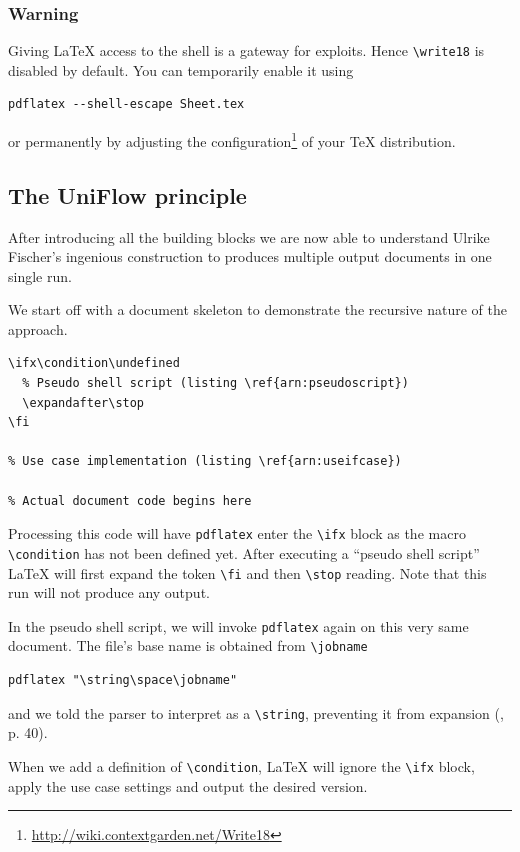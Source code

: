\documentclass{maps}
\begin{document}
\subsubsection{Warning}
Giving \LaTeX{} access to the shell is a gateway for exploits. Hence \verb+\write18+ is disabled by default. You can temporarily enable it using 
\begin{verbatim}
pdflatex --shell-escape Sheet.tex
\end{verbatim}
or permanently by adjusting the configuration\footnote{\url{http://wiki.contextgarden.net/Write18}} of your \TeX{} distribution.

\subsection{The UniFlow principle}
After introducing all the building blocks we are now able to understand Ulrike Fischer's ingenious construction \cite{arn:fischer} to produces multiple output documents in one single run.

We start off with a document skeleton to demonstrate the recursive nature of the approach.

\begin{lstlisting}[language={[LaTeX]TeX}, style=arn:lst, texcl=true, caption={General UniFlow template}, label=arn:unitemplate]
% Beginning of Sheet.tex
\ifx\condition\undefined
  % Pseudo shell script (listing \ref{arn:pseudoscript})
  \expandafter\stop
\fi

% Use case implementation (listing \ref{arn:useifcase})

% Actual document code begins here
\end{lstlisting}
Processing this code will have \texttt{pdflatex} enter the \verb+\ifx+ block as the macro \verb+\condition+ has not been defined yet. After executing a \enquote{pseudo shell script} \LaTeX{} will first expand the token \verb+\fi+ and then \verb+\stop+ reading. Note that this run will not produce any output.

In the pseudo shell script, we will invoke \texttt{pdflatex} again on this very same document. The file's base name is obtained from \verb+\jobname+ 
\begin{verbatim}
pdflatex "\string\space\jobname"
\end{verbatim}
and we told the parser to interpret \verb++ as a \verb+\string+, preventing it from expansion (\cite{arn:knuth}, p. 40).

When we add a definition of \verb+\condition+, \LaTeX{} will ignore the \verb+\ifx+ block, apply the use case settings and output the desired version.
\end{document}
